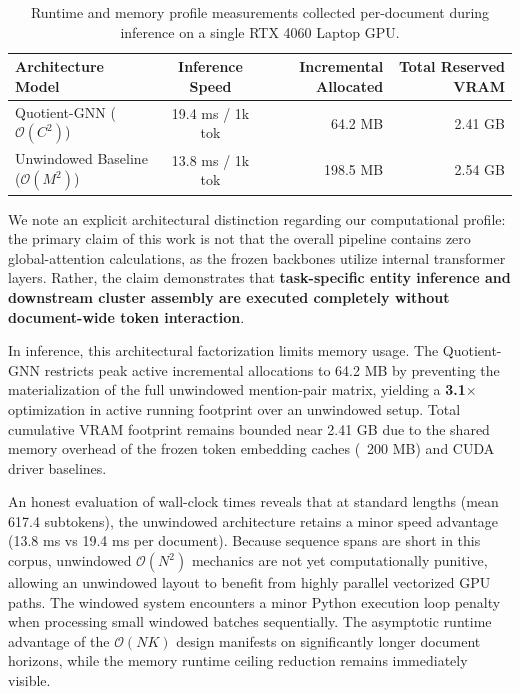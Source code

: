 \documentclass[12pt]{article}
\begin{document}
	\begin{table}[ht]
		\centering
		\small
		\begin{tabularx}{\textwidth}{lcrr}
			\toprule
			\textbf{Architecture Model} & \textbf{Inference Speed} & \textbf{Incremental Allocated} & \textbf{Total Reserved VRAM} \\
			\midrule
			Quotient-GNN ($\mathcal{O}(C^2)$)  & 19.4 ms / 1k tok & 64.2 MB  & 2.41 GB \\
			Unwindowed Baseline ($\mathcal{O}(M^2)$)  & 13.8 ms / 1k tok & 198.5 MB & 2.54 GB \\
			\bottomrule
		\end{tabularx}
		\caption{Runtime and memory profile measurements collected per-document during inference on a single RTX 4060 Laptop GPU.}
		\label{tab:profiling}
	\end{table}
	
	We note an explicit architectural distinction regarding our computational profile: the primary claim of this work is not that the overall pipeline contains zero global-attention calculations, as the frozen backbones utilize internal transformer layers. Rather, the claim demonstrates that \textbf{task-specific entity inference and downstream cluster assembly are executed completely without document-wide token interaction}.
	
	In inference, this architectural factorization limits memory usage. The Quotient-GNN restricts peak active incremental allocations to 64.2 MB by preventing the materialization of the full unwindowed mention-pair matrix, yielding a \textbf{3.1$\times$} optimization in active running footprint over an unwindowed setup. Total cumulative VRAM footprint remains bounded near 2.41 GB due to the shared memory overhead of the frozen token embedding caches (~200 MB) and CUDA driver baselines.
	
	An honest evaluation of wall-clock times reveals that at standard lengths (mean 617.4 subtokens), the unwindowed architecture retains a minor speed advantage (13.8 ms vs 19.4 ms per document). Because sequence spans are short in this corpus, unwindowed $\mathcal{O}(N^2)$ mechanics are not yet computationally punitive, allowing an unwindowed layout to benefit from highly parallel vectorized GPU paths. The windowed system encounters a minor Python execution loop penalty when processing small windowed batches sequentially. The asymptotic runtime advantage of the $\mathcal{O}(NK)$ design manifests on significantly longer document horizons, while the memory runtime ceiling reduction remains immediately visible.
	
\end{document}
